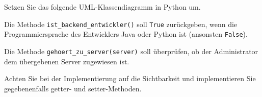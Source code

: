 \documentclass[11pt, a4paper, oneside]{article}
\begin{document}
	\pagebreak
	
	
	Setzen Sie das folgende UML-Klassendiagramm in Python um.
	
	\begin{figure}[h]
		\centering
	\end{figure}
	
	Die Methode \texttt{ist\_backend\_entwickler()} soll \texttt{True} zurückgeben, wenn die Programmiersprache des Entwicklers Java oder Python ist (ansonsten \texttt{False}).
	
	Die Methode \texttt{gehoert\_zu\_server(server)} soll überprüfen, ob der Administrator dem übergebenen Server zugewiesen ist.
	
	Achten Sie bei der Implementierung auf die Sichtbarkeit und implementieren Sie gegebenenfalls getter- und setter-Methoden.
	
\end{document}
